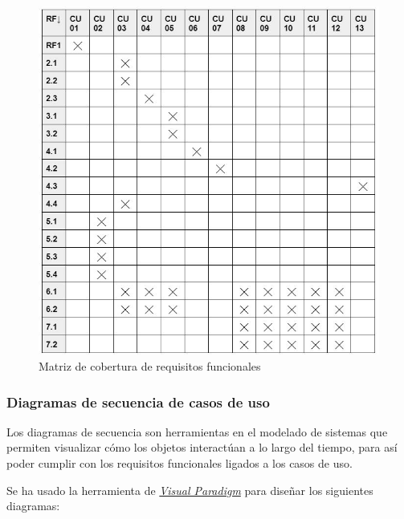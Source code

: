\begin{figure}[H]
	\centering
	\includegraphics{imgs/matriz-requisitos.JPG}
	\caption{Matriz de cobertura de requisitos funcionales}
	\label{fig:matriz-requisitos}
\end{figure}

\newpage
\subsubsection{Diagramas de secuencia de casos de uso}

Los diagramas de secuencia son herramientas en el modelado de sistemas que permiten visualizar cómo los objetos interactúan a lo largo del tiempo, para así poder cumplir con los requisitos funcionales ligados a los casos de uso.

Se ha usado la herramienta de \href{https://www.visual-paradigm.com/}{\textit{Visual Paradigm}} para diseñar los siguientes diagramas:

